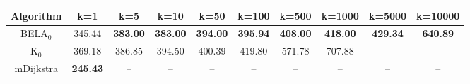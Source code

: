 \begin{tabular}{c|ccccccccc}\toprule
Algorithm & k=1 & k=5 & k=10 & k=50 & k=100 & k=500 & k=1000 & k=5000 & k=10000 \\ \midrule
BELA$_0$ & 345.44 & \textbf{383.00} & \textbf{383.00} & \textbf{394.00} & \textbf{395.94} & \textbf{408.00} & \textbf{418.00} & \textbf{429.34} & \textbf{640.89} \\
K$_0$ & 369.18 & 386.85 & 394.50 & 400.39 & 419.80 & 571.78 & 707.88 & -- & -- \\
mDijkstra & \textbf{245.43} & -- & -- & -- & -- & -- & -- & -- & -- \\ \bottomrule 
\end{tabular}
